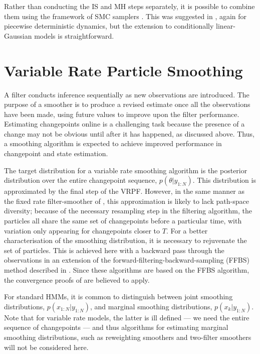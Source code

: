 \documentclass[10pt,twocolumn,twoside]{IEEEtran}
\begin{document}
Rather than conducting the IS and MH steps separately, it is possible to combine them using the framework of SMC samplers \cite{DelMoral2006}. This was suggested in \cite{Whiteley2011}, again for piecewise deterministic dynamics, but the extension to conditionally linear-Gaussian models is straightforward.



\section{Variable Rate Particle Smoothing} \label{sec:vrps}

A filter conducts inference sequentially as new observations are introduced. The purpose of a smoother is to produce a revised estimate once all the observations have been made, using future values to improve upon the filter performance. Estimating changepoints online is a challenging task because the presence of a change may not be obvious until after it has happened, as discussed above. Thus, a smoothing algorithm is expected to achieve improved performance in changepoint and state estimation.

The target distribution for a variable rate smoothing algorithm is the posterior distribution over the entire changepoint sequence, $p(\theta|y_{1:N})$. This distribution is approximated by the final step of the VRPF. However, in the same manner as the fixed rate filter-smoother of \cite{Kitagawa1996}, this approximation is likely to lack path-space diversity; because of the necessary resampling step in the filtering algorithm, the particles all share the same set of changepoints before a particular time, with variation only appearing for changepoints closer to $T$. For a better characterisation of the smoothing distribution, it is necessary to rejuvenate the set of particles. This is achieved here with a backward pass through the observations in an extension of the forward-filtering-backward-sampling (FFBS) method described in \cite{Godsill2004}. Since these algorithms are based on the FFBS algorithm, the convergence proofs of \cite{Godsill2004,Douc2011} are believed to apply.

For standard HMMs, it is common to distinguish between joint smoothing distributions, $p(x_{1:N}|y_{1:N})$, and marginal smoothing distributions, $p(x_k|y_{1:N})$. Note that for variable rate models, the latter is ill defined --- we need the entire sequence of changepoints --- and thus algorithms for estimating marginal smoothing distributions, such as reweighting smoothers \cite{Doucet2000} and two-filter smoothers \cite{Briers2010,Fearnhead2010} will not be considered here.
\end{document}
